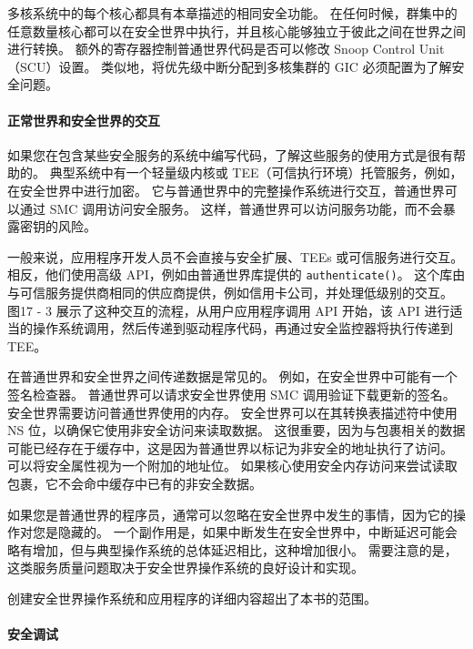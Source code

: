多核系统中的每个核心都具有本章描述的相同安全功能。
在任何时候，群集中的任意数量核心都可以在安全世界中执行，并且核心能够独立于彼此之间在世界之间进行转换。
额外的寄存器控制普通世界代码是否可以修改 Snoop Control Unit（SCU）设置。
类似地，将优先级中断分配到多核集群的 GIC 必须配置为了解安全问题。

\paragraph*{正常世界和安全世界的交互}

如果您在包含某些安全服务的系统中编写代码，了解这些服务的使用方式是很有帮助的。
典型系统中有一个轻量级内核或 TEE（可信执行环境）托管服务，例如，在安全世界中进行加密。
它与普通世界中的完整操作系统进行交互，普通世界可以通过 SMC 调用访问安全服务。
这样，普通世界可以访问服务功能，而不会暴露密钥的风险。

一般来说，应用程序开发人员不会直接与安全扩展、TEEs 或可信服务进行交互。
相反，他们使用高级 API，例如由普通世界库提供的 \lstinline!authenticate()!。
这个库由与可信服务提供商相同的供应商提供，例如信用卡公司，并处理低级别的交互。
图17 - 3 展示了这种交互的流程，从用户应用程序调用 API 开始，该 API 进行适当的操作系统调用，然后传递到驱动程序代码，再通过安全监控器将执行传递到 TEE。


在普通世界和安全世界之间传递数据是常见的。
例如，在安全世界中可能有一个签名检查器。
普通世界可以请求安全世界使用 SMC 调用验证下载更新的签名。
安全世界需要访问普通世界使用的内存。
安全世界可以在其转换表描述符中使用 NS 位，以确保它使用非安全访问来读取数据。
这很重要，因为与包裹相关的数据可能已经存在于缓存中，这是因为普通世界以标记为非安全的地址执行了访问。
可以将安全属性视为一个附加的地址位。
如果核心使用安全内存访问来尝试读取包裹，它不会命中缓存中已有的非安全数据。

如果您是普通世界的程序员，通常可以忽略在安全世界中发生的事情，因为它的操作对您是隐藏的。
一个副作用是，如果中断发生在安全世界中，中断延迟可能会略有增加，但与典型操作系统的总体延迟相比，这种增加很小。
需要注意的是，这类服务质量问题取决于安全世界操作系统的良好设计和实现。

创建安全世界操作系统和应用程序的详细内容超出了本书的范围。

\paragraph*{安全调试}

